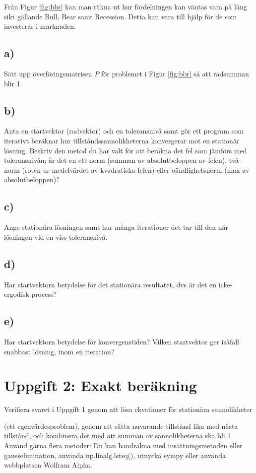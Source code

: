 \documentclass[a4paper]{article}
\begin{document}
Från Figur \ref{fig:bbr} kan man räkna ut hur fördelningen kan väntas vara på lång sikt gällande Bull, Bear samt Recession.
Detta kan vara till hjälp för de som investerar i marknaden.

\subsection{a)}
Sätt upp överföringsmatrisen \( P \) för problemet i Figur \ref{fig:bbr} så att radsumman blir 1.

\subsection{b)}
Anta en startvektor (radvektor) och en toleransnivå samt gör ett program som iterativt
beräknar hur tillståndssannolikheterna konvergerar mot en stationär lösning. Beskriv den
metod du har valt för att beräkna det fel som jämförs med toleransnivån; är det en ett-norm
(summan av absolutbeloppen av felen), två-norm (roten ur medelvärdet av kvadratiska
felen) eller oändlighetsnorm (max av absolutbeloppen)?

\subsection{c)}
Ange stationära lösningen samt hur många iterationer det tar till den når lösningen vid en
viss toleransnivå.

\subsection{d)}
Har startvektorn betydelse för det stationära resultatet, dvs är det en icke-ergodisk process?

\subsection{e)}
Har startvektorn betydelse för konvergenstiden? Vilken startvektor ger isåfall snabbast
lösning, inom en iteration?

\section{Uppgift 2: Exakt beräkning}
Verifiera svaret i Uppgift 1 genom att lösa ekvationer för stationära sannolikheter

(ett egenvärdesproblem), genom att sätta nuvarande tillstånd lika med nästa tillstånd, och
kombinera det med att summan av sannolikheterna ska bli 1. Använd gärna flera metoder: Du
kan handräkna med insättningsmetoden eller gausselimination,
använda np.linalg.lstsq(), utnycka sympy eller använda
webbplatsen Wolfram Alpha.
\end{document}
